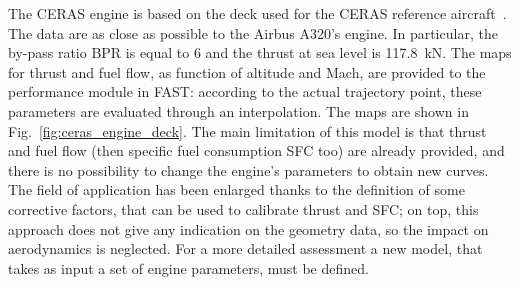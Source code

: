 The CERAS engine is based on the deck used for the CERAS reference aircraft~\cite{bib:ceras}. 
The data are as close as possible to the Airbus A320's engine.
In particular, the by-pass ratio BPR is equal to 6 and the thrust at sea level is 117.8~\si{\kilo\newton}.  
The maps for thrust and fuel flow, as function of altitude and Mach, are provided to the performance module in FAST: according to the actual trajectory point, these parameters are evaluated through an interpolation. 
The maps are shown in Fig.~\ref{fig:ceras_engine_deck}.
The main limitation of this model is that thrust and fuel flow (then specific fuel consumption SFC too) are already provided, and there is no possibility to change the engine's parameters to obtain new curves. 
The field of application has been enlarged thanks to the definition of some corrective factors, that can be used to calibrate thrust and SFC; on top, this approach does not give any indication on the geometry data, so the impact on aerodynamics is neglected.
For a more detailed assessment a new model, that takes as input a set of engine parameters, must be defined.

